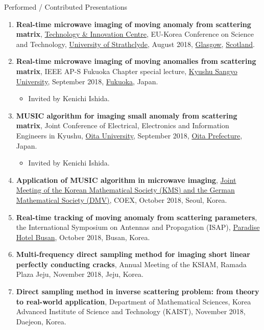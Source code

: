 \documentclass{resume} %
\begin{document}
\begin{rSection}{Performed / Contributed Presentations}
\begin{enumerate}
\item\label{P-EKC2018} \textbf{Real-time microwave imaging of moving anomaly from scattering matrix}, \href{https://www.strath.ac.uk/research/technologyandinnovationcentre/}{Technology \& Innovation Centre}, EU-Korea Conference on Science and Technology, \href{https://www.strath.ac.uk}{University of Strathclyde}, August 2018, \href{https://peoplemakeglasgow.com}{Glasgow}, \href{https://www.visitscotland.com}{Scotland}.
\item\label{P-KSU2018} \textbf{Real-time microwave imaging of moving anomalies from scattering matrix}, IEEE AP-S Fukuoka Chapter special lecture, \href{https://www.kyusan-u.ac.jp/E/}{Kyushu Sangyo University}, September 2018, \href{http://www.city.fukuoka.lg.jp/index.html}{Fukuoka}, Japan.
\begin{itemize}
\item Invited by Kenichi Ishida.
\end{itemize}
\item\label{P-JCEEIE2018} \textbf{MUSIC algorithm for imaging small anomaly from scattering matrix},  Joint Conference of Electrical, Electronics and Information Engineers in Kyushu, \href{https://www.oita-u.ac.jp/lang/en/}{Oita University}, September 2018, \href{https://www.japan-guide.com/list/e1243.html}{Oita Prefecture}, Japan.
\begin{itemize}
\item Invited by Kenichi Ishida.
\end{itemize}
\item\label{P-KMS2018} \textbf{Application of MUSIC algorithm in microwave imaging}, \href{https://www.kms.or.kr/KMS-DMV/}{Joint Meeting of the Korean Mathematical Society (KMS) and the German Mathematical Society (DMV)}, COEX, October 2018, Seoul, Korea.
\item\label{P-ISAP2018} \textbf{Real-time tracking of moving anomaly from scattering parameters}, the  International Symposium on Antennas and Propagation (ISAP), \href{http://www.busanparadisehotel.co.kr}{Paradise Hotel Busan}, October 2018, Busan, Korea.
\item\label{P-KSIAM2018} \textbf{Multi-frequency direct sampling method for imaging short linear perfectly conducting cracks}, Annual Meeting of the KSIAM, Ramada Plaza Jeju, November 2018, Jeju, Korea.
\item\label{P-KAIST2018} \textbf{Direct sampling method in inverse scattering problem: from theory to real-world application}, Department of Mathematical Sciences, Korea Advanced Institute of Science and Technology (KAIST), November 2018, Daejeon, Korea.

\end{enumerate}
\end{rSection}
\end{document}
